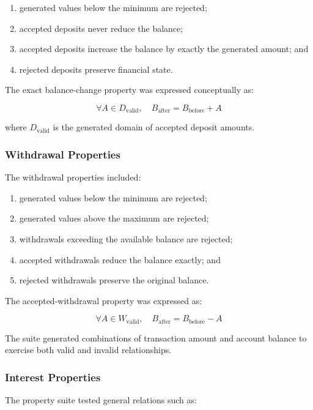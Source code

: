 \documentclass[12pt]{article}
\begin{document}
\begin{enumerate}
    \item generated values below the minimum are rejected;
    \item accepted deposits never reduce the balance;
    \item accepted deposits increase the balance by exactly the generated
          amount; and
    \item rejected deposits preserve financial state.
\end{enumerate}

The exact balance-change property was expressed conceptually as:

\[
\forall A \in D_{\text{valid}},
\quad
B_{\text{after}} = B_{\text{before}} + A
\]

where \(D_{\text{valid}}\) is the generated domain of accepted deposit amounts.

\subsubsection{Withdrawal Properties}

The withdrawal properties included:

\begin{enumerate}
    \item generated values below the minimum are rejected;
    \item generated values above the maximum are rejected;
    \item withdrawals exceeding the available balance are rejected;
    \item accepted withdrawals reduce the balance exactly; and
    \item rejected withdrawals preserve the original balance.
\end{enumerate}

The accepted-withdrawal property was expressed as:

\[
\forall A \in W_{\text{valid}},
\quad
B_{\text{after}} = B_{\text{before}} - A
\]

The suite generated combinations of transaction amount and account balance to
exercise both valid and invalid relationships.

\subsubsection{Interest Properties}

The property suite tested general relations such as:
\end{document}
